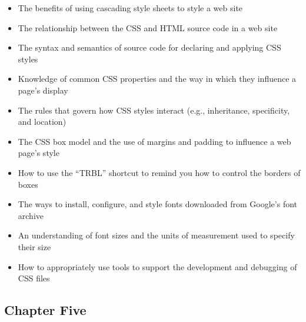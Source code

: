 \documentclass[11pt]{article}
\begin{document}
\begin{itemize}

  \itemsep 0in

  \item The benefits of using cascading style sheets to style a web site
  \item The relationship between the CSS and HTML source code in a web site
  \item The syntax and semantics of source code for declaring and applying CSS
    styles
  \item Knowledge of common CSS properties and the way in which they influence
    a page's display
  \item The rules that govern how CSS styles interact (e.g., inheritance,
    specificity, and location)
  \item The CSS box model and the use of margins and padding to influence a web
    page's style
  \item How to use the ``TRBL'' shortcut to remind you how to control the
    borders of boxes
  \item The ways to install, configure, and style fonts downloaded from Google's
    font archive
  \item An understanding of font sizes and the units of measurement used to
    specify their size
  \item How to appropriately use tools to support the development and
    debugging of CSS files

\end{itemize}

\vspace*{-.2in}
\subsection*{Chapter Five}
\end{document}

